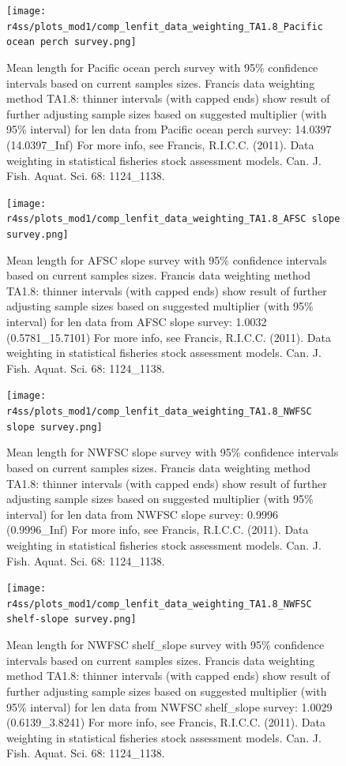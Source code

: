 \documentclass[12pt,]{article}
\begin{document}
\begin{figure}
\centering
\texttt{[image: r4ss/plots\_mod1/comp\_lenfit\_data\_weighting\_TA1.8\_Pacific ocean perch survey.png]}
\caption{Mean length for Pacific ocean perch survey with 95\% confidence
intervals based on current samples sizes. Francis data weighting method
TA1.8: thinner intervals (with capped ends) show result of further
adjusting sample sizes based on suggested multiplier (with 95\%
interval) for len data from Pacific ocean perch survey: 14.0397
(14.0397\_Inf) For more info, see Francis, R.I.C.C. (2011). Data
weighting in statistical fisheries stock assessment models. Can. J.
Fish. Aquat. Sci. 68: 1124\_1138. \label{fig:weighting_len_pop}}
\end{figure}

\begin{figure}
\centering
\texttt{[image: r4ss/plots\_mod1/comp\_lenfit\_data\_weighting\_TA1.8\_AFSC slope survey.png]}
\caption{Mean length for AFSC slope survey with 95\% confidence
intervals based on current samples sizes. Francis data weighting method
TA1.8: thinner intervals (with capped ends) show result of further
adjusting sample sizes based on suggested multiplier (with 95\%
interval) for len data from AFSC slope survey: 1.0032 (0.5781\_15.7101)
For more info, see Francis, R.I.C.C. (2011). Data weighting in
statistical fisheries stock assessment models. Can. J. Fish. Aquat. Sci.
68: 1124\_1138. \label{fig:weighting_len_afsc}}
\end{figure}

\begin{figure}
\centering
\texttt{[image: r4ss/plots\_mod1/comp\_lenfit\_data\_weighting\_TA1.8\_NWFSC slope survey.png]}
\caption{Mean length for NWFSC slope survey with 95\% confidence
intervals based on current samples sizes. Francis data weighting method
TA1.8: thinner intervals (with capped ends) show result of further
adjusting sample sizes based on suggested multiplier (with 95\%
interval) for len data from NWFSC slope survey: 0.9996 (0.9996\_Inf) For
more info, see Francis, R.I.C.C. (2011). Data weighting in statistical
fisheries stock assessment models. Can. J. Fish. Aquat. Sci. 68:
1124\_1138. \label{fig:weighting_len_nwfsc}}
\end{figure}

\begin{figure}
\centering
\texttt{[image: r4ss/plots\_mod1/comp\_lenfit\_data\_weighting\_TA1.8\_NWFSC shelf-slope survey.png]}
\caption{Mean length for NWFSC shelf\_slope survey with 95\% confidence
intervals based on current samples sizes. Francis data weighting method
TA1.8: thinner intervals (with capped ends) show result of further
adjusting sample sizes based on suggested multiplier (with 95\%
interval) for len data from NWFSC shelf\_slope survey: 1.0029
(0.6139\_3.8241) For more info, see Francis, R.I.C.C. (2011). Data
weighting in statistical fisheries stock assessment models. Can. J.
Fish. Aquat. Sci. 68: 1124\_1138. \label{fig:weighting_len_nwfsccombo}}
\end{figure}
\end{document}
